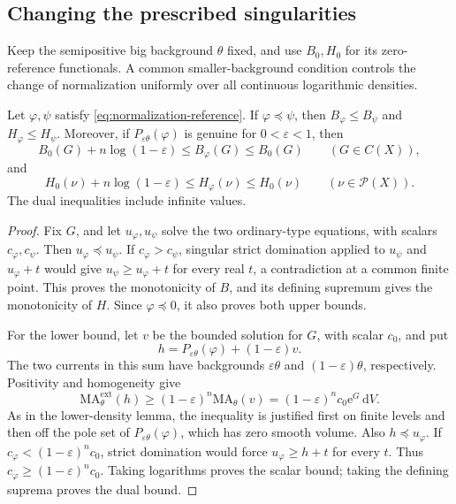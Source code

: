 \subsection{Changing the prescribed singularities}

Keep the semipositive big background $\theta$ fixed, and use $B_0,H_0$ for its zero-reference functionals. A common smaller-background condition controls the change of normalization uniformly over all continuous logarithmic densities.

\begin{proposition}\label{prop:reference-normalization-comparison}
Let $\varphi,\psi$ satisfy \eqref{eq:normalization-reference}. If $\varphi\preceq\psi$, then $B_\varphi\leq B_\psi$ and $H_\varphi\leq H_\psi$. Moreover, if $P_{\varepsilon\theta}(\varphi)$ is genuine for $0<\varepsilon<1$, then
\[
 B_0(G)+n\log(1-\varepsilon)
       \leq B_\varphi(G)\leq B_0(G)
       \qquad(G\in C(X)),
\]
and
\[
 H_0(\nu)+n\log(1-\varepsilon)
       \leq H_\varphi(\nu)\leq H_0(\nu)
       \qquad(\nu\in\mathcal P(X)).
\]
The dual inequalities include infinite values.
\end{proposition}
\begin{proof}
Fix $G$, and let $u_\varphi,u_\psi$ solve the two ordinary-type equations, with scalars $c_\varphi,c_\psi$. Then $u_\varphi\preceq u_\psi$. If $c_\varphi>c_\psi$, singular strict domination applied to $u_\psi$ and $u_\varphi+t$ would give $u_\psi\geq u_\varphi+t$ for every real $t$, a contradiction at a common finite point. This proves the monotonicity of $B$, and its defining supremum gives the monotonicity of $H$. Since $\varphi\preceq0$, it also proves both upper bounds.

For the lower bound, let $v$ be the bounded solution for $G$, with scalar $c_0$, and put
\[
 h=P_{\varepsilon\theta}(\varphi)+(1-\varepsilon)v.
\]
The two currents in this sum have backgrounds $\varepsilon\theta$ and $(1-\varepsilon)\theta$, respectively. Positivity and homogeneity give
\[
 \mathrm{MA}^{\mathrm{ext}}_\theta(h)
       \geq(1-\varepsilon)^n\mathrm{MA}_\theta(v)
       =(1-\varepsilon)^nc_0\mathrm{e}^G\,\mathrm{d}V.
\]
As in the lower-density lemma, the inequality is justified first on finite levels and then off the pole set of $P_{\varepsilon\theta}(\varphi)$, which has zero smooth volume. Also $h\preceq u_\varphi$. If $c_\varphi<(1-\varepsilon)^nc_0$, strict domination would force $u_\varphi\geq h+t$ for every $t$. Thus $c_\varphi\geq(1-\varepsilon)^nc_0$. Taking logarithms proves the scalar bound; taking the defining suprema proves the dual bound.
\end{proof}

